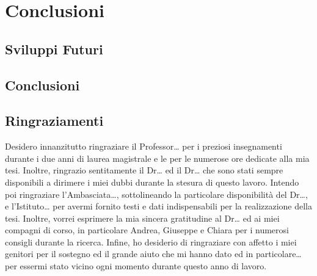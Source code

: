 \chapter{Conclusioni}


\section{Sviluppi Futuri}


\section{Conclusioni}


\section{Ringraziamenti}
Desidero innanzitutto ringraziare il Professor… per i preziosi insegnamenti durante i due anni di laurea magistrale e le per le numerose ore dedicate alla mia tesi. Inoltre, ringrazio sentitamente il Dr… ed il Dr… che sono stati sempre disponibili a dirimere i miei dubbi durante la stesura di questo lavoro. Intendo poi ringraziare l’Ambasciata…, sottolineando la particolare disponibilità del Dr…, e l’Istituto… per avermi fornito testi e dati indispensabili per la realizzazione della tesi. Inoltre, vorrei esprimere la mia sincera gratitudine al Dr… ed ai miei compagni di corso, in particolare Andrea, Giuseppe e Chiara per i numerosi consigli durante la ricerca. Infine, ho desiderio di ringraziare con affetto i miei genitori per il sostegno ed il grande aiuto che mi hanno dato ed in particolare… per essermi stato vicino ogni momento durante questo anno di lavoro.